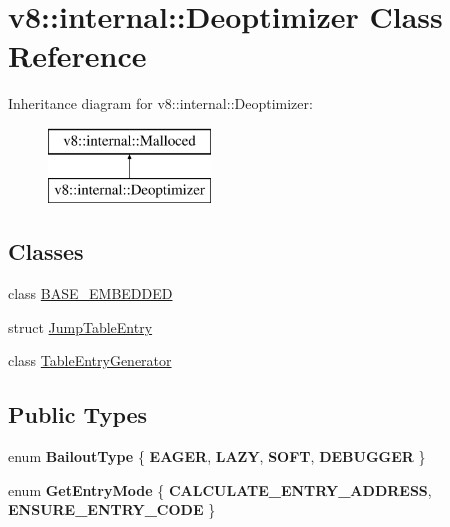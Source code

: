 \hypertarget{classv8_1_1internal_1_1_deoptimizer}{}\section{v8\+:\+:internal\+:\+:Deoptimizer Class Reference}
\label{classv8_1_1internal_1_1_deoptimizer}
Inheritance diagram for v8\+:\+:internal\+:\+:Deoptimizer\+:\begin{figure}[H]
\begin{center}
\leavevmode
\includegraphics[height=2.000000cm]{classv8_1_1internal_1_1_deoptimizer}
\end{center}
\end{figure}
\subsection*{Classes}
\begin{DoxyCompactItemize}
\item 
class \hyperlink{classv8_1_1internal_1_1_deoptimizer_1_1_b_a_s_e___e_m_b_e_d_d_e_d}{B\+A\+S\+E\+\_\+\+E\+M\+B\+E\+D\+D\+E\+D}
\item 
struct \hyperlink{structv8_1_1internal_1_1_deoptimizer_1_1_jump_table_entry}{Jump\+Table\+Entry}
\item 
class \hyperlink{classv8_1_1internal_1_1_deoptimizer_1_1_table_entry_generator}{Table\+Entry\+Generator}
\end{DoxyCompactItemize}
\subsection*{Public Types}
\begin{DoxyCompactItemize}
\item 
\hypertarget{classv8_1_1internal_1_1_deoptimizer_a25e154e5dc24b78aa0bd15b207eb3be7}{}enum {\bfseries Bailout\+Type} \{ {\bfseries E\+A\+G\+E\+R}, 
{\bfseries L\+A\+Z\+Y}, 
{\bfseries S\+O\+F\+T}, 
{\bfseries D\+E\+B\+U\+G\+G\+E\+R}
 \}\label{classv8_1_1internal_1_1_deoptimizer_a25e154e5dc24b78aa0bd15b207eb3be7}

\item 
\hypertarget{classv8_1_1internal_1_1_deoptimizer_a63a30dbded23ad47438ed06d9d7eb3ac}{}enum {\bfseries Get\+Entry\+Mode} \{ {\bfseries C\+A\+L\+C\+U\+L\+A\+T\+E\+\_\+\+E\+N\+T\+R\+Y\+\_\+\+A\+D\+D\+R\+E\+S\+S}, 
{\bfseries E\+N\+S\+U\+R\+E\+\_\+\+E\+N\+T\+R\+Y\+\_\+\+C\+O\+D\+E}
 \}\label{classv8_1_1internal_1_1_deoptimizer_a63a30dbded23ad47438ed06d9d7eb3ac}

\end{DoxyCompactItemize}
